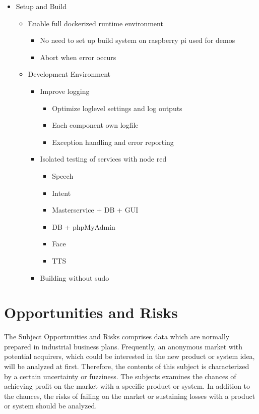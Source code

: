 \documentclass[12pt]{article}
\theoremstyle{definition}
\newenvironment{explanation}{%
   \setlength{\parindent}{0pt}
   \itshape
   \color{blue}
}{}
\begin{document}
\begin{itemize}
    \item Setup and Build
    \begin{itemize}
        \item Enable full dockerized runtime environment
        \begin{itemize}
            \item No need to set up build system on raspberry pi used for demos
            \item Abort when error occurs
        \end{itemize}
        \item Development Environment
        \begin{itemize}
            \item Improve logging
            \begin{itemize}
                \item Optimize loglevel settings and log outputs
                \item Each component own logfile
                \item Exception handling and error reporting 
            \end{itemize}
            \item Isolated testing of services with node red
            \begin{itemize}
                \item Speech
                \item Intent
                \item Masterservice + DB + GUI
                \item DB + phpMyAdmin
                \item Face
                \item TTS
            \end{itemize}
            \item Building without sudo
        \end{itemize}
    \end{itemize}
    
\end{itemize}

\pagebreak

\section{Opportunities and Risks}
\begin{explanation}
The Subject Opportunities and Risks comprises data which are normally prepared in industrial business plans. Frequently, an anonymous market with potential acquirers, which could be interested in the new product or system idea, will be analyzed at first. Therefore, the contents of this subject is characterized by a certain uncertainty or fuzziness. The subjects examines the chances of achieving profit on the market with a specific product or system. In addition to the chances, the risks of failing on the market or sustaining losses with a product or system should be analyzed.
\end{explanation}
\end{document}
